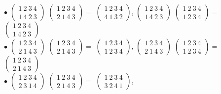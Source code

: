 \documentclass[12pt,a4paper]{scrartcl}
\begin{document}
	$\bullet$
	$\begin{pmatrix}
	1~2~3~4\\
	1~4~2~3
	\end{pmatrix}$
	$\begin{pmatrix}
	1~2~3~4\\
	2~1~4~3
	\end{pmatrix} = $ $\begin{pmatrix}
	1~2~3~4\\
	4~1~3~2
	\end{pmatrix}$, 
	$\begin{pmatrix}
	1~2~3~4\\
	1~4~2~3
	\end{pmatrix}$
	$\begin{pmatrix}
	1~2~3~4\\
	1~2~3~4
	\end{pmatrix} = $
	$\begin{pmatrix}
	1~2~3~4\\
	1~4~2~3	\end{pmatrix}$\\
	$\bullet$
	$\begin{pmatrix}
	1~2~3~4\\
	2~1~4~3
	\end{pmatrix}$
	$\begin{pmatrix}
	1~2~3~4\\
	2~1~4~3
	\end{pmatrix} = $ $\begin{pmatrix}
	1~2~3~4\\
	1~2~3~4
	\end{pmatrix}$, 
	$\begin{pmatrix}
	1~2~3~4\\
	2~1~4~3
	\end{pmatrix}$
	$\begin{pmatrix}
	1~2~3~4\\
	1~2~3~4
	\end{pmatrix} = $
	$\begin{pmatrix}
	1~2~3~4\\
	2~1~4~3	\end{pmatrix}$\\
	$\bullet$
	$\begin{pmatrix}
	1~2~3~4\\
	2~3~1~4
	\end{pmatrix}$
	$\begin{pmatrix}
	1~2~3~4\\
	2~1~4~3
	\end{pmatrix} = $ $\begin{pmatrix}
	1~2~3~4\\
	3~2~4~1
	\end{pmatrix}$, 
\end{document}
